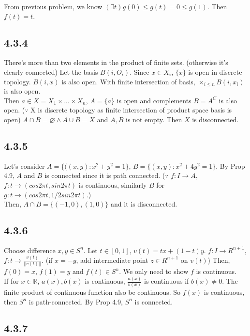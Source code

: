 \documentclass{article}
\let\emptyset\varnothing
\begin{document}
From previous problem, we know $(\exists t)g(0) \leq g(t)=0 \leq g(1)$. Then $f(t)=t$.

\subsection*{4.3.4}

There's more than two elements in the product of finite sets. (otherwise it's clearly connected) Let the basis $B(i, O_i)$. Since $x\in X_i$, $\{x\}$ is open in discrete topology. $B(i, {x})$ is also open. With finite intersection of basis, $\times_{i \leq n} B(i,{x_i})$ is also open.\\
Then $a\in X=X_1 \times. ..\times X_n$, $A=\{a\}$ is open and complements $B=A^C$ is also open. ($\because$ X is discrete topology as finite intersection of product space basis is open) $A \cap B=\emptyset \wedge A\cup B=X$ and $A, B$ is not empty. Then $X$ is disconnected.

\subsection*{4.3.5}

Let's consider $A=\{((x,y):x^2+y^2=1\}$, $B=\{(x,y) : x^2+4y^2=1\}$. By Prop 4.9, $A$ and $B$ is connected since it is path connected. ($\because$ $f:I\to A$, $f: t\to (cos 2\pi t, sin 2\pi t)$ is continuous, similarly $B$ for $g:t \to (cos2\pi t, 1/2sin2\pi t)$.)\\
Then, $A \cap B=\{(-1,0),(1,0)\}$ and it is disconnected.

\subsection*{4.3.6}

Choose difference $x,y\in S^n$. Let $t\in[0,1]$, $v(t)=tx+(1-t)y$. $f:I\to R^{n+1}$, $f:t\to \frac{v(t)}{||v(t)||}$. (if $x=-y$, add intermediate point $z \in R^{n+1}$ on $v(t)$) Then, $f(0)=x$, $f(1)=y$ and $f(t)\in S^n$. We only need to show $f$ is continuous.\\
If for $x\in\mathbb{R}$, $a(x), b(x)$ is continuous, $\frac{a(x)}{b(x)}$ is continuous if $b(x) \neq 0$. The finite product of continuous function also be continuous. So $f(x)$ is continuous, then $S^n$ is path-connected.
By Prop 4.9, $S^n$ is connected.

\subsection*{4.3.7}
\end{document}
